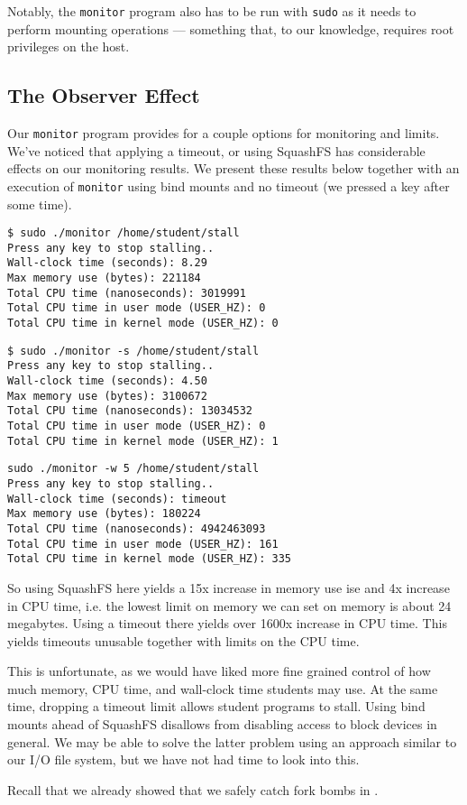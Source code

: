 Notably, the \texttt{monitor} program also has to be run with \texttt{sudo} as
it needs to perform mounting operations --- something that, to our knowledge,
requires root privileges on the host.

\subsection{The Observer Effect}

Our \texttt{monitor} program provides for a couple options for monitoring and
limits. We've noticed that applying a timeout, or using SquashFS has
considerable effects on our monitoring results. We present these results below
together with an execution of \texttt{monitor} using bind mounts and no timeout
(we pressed a key after some time).

\begin{lstlisting}
$ sudo ./monitor /home/student/stall
Press any key to stop stalling..
Wall-clock time (seconds): 8.29
Max memory use (bytes): 221184
Total CPU time (nanoseconds): 3019991
Total CPU time in user mode (USER_HZ): 0
Total CPU time in kernel mode (USER_HZ): 0
\end{lstlisting}

\begin{lstlisting}
$ sudo ./monitor -s /home/student/stall
Press any key to stop stalling..
Wall-clock time (seconds): 4.50
Max memory use (bytes): 3100672
Total CPU time (nanoseconds): 13034532
Total CPU time in user mode (USER_HZ): 0
Total CPU time in kernel mode (USER_HZ): 1
\end{lstlisting}

\begin{lstlisting}
sudo ./monitor -w 5 /home/student/stall
Press any key to stop stalling..
Wall-clock time (seconds): timeout
Max memory use (bytes): 180224
Total CPU time (nanoseconds): 4942463093
Total CPU time in user mode (USER_HZ): 161
Total CPU time in kernel mode (USER_HZ): 335
\end{lstlisting}

So using SquashFS here yields a 15x increase in memory use ise and 4x increase
in CPU time, i.e. the lowest limit on memory we can set on memory is about 24
megabytes. Using a timeout there yields over 1600x increase in CPU time. This
yields timeouts unusable together with limits on the CPU time.

This is unfortunate, as we would have liked more fine grained control of how
much memory, CPU time, and wall-clock time students may use. At the same time,
dropping a timeout limit allows student programs to stall.  Using bind mounts
ahead of SquashFS disallows from disabling access to block devices in general.
We may be able to solve the latter problem using an approach similar to our I/O
file system, but we have not had time to look into this.

Recall that we already showed that we safely catch fork bombs in
.


